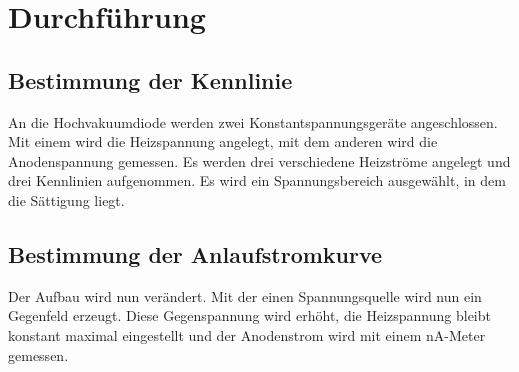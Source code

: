 \section{Durchführung}
\subsection{ Bestimmung der Kennlinie}

An die Hochvakuumdiode werden zwei Konstantspannungsgeräte angeschlossen. Mit einem
wird die Heizspannung angelegt, mit dem anderen wird die Anodenspannung gemessen.
Es werden drei verschiedene Heizströme angelegt und drei Kennlinien aufgenommen. Es
wird ein Spannungsbereich ausgewählt, in dem die Sättigung liegt.

\subsection{Bestimmung der Anlaufstromkurve}
Der Aufbau wird nun verändert. Mit der einen Spannungsquelle wird nun ein Gegenfeld
erzeugt. Diese Gegenspannung wird erhöht, die Heizspannung bleibt konstant maximal
eingestellt und der Anodenstrom wird mit einem nA-Meter gemessen.


\label{sec:Durchführung}
